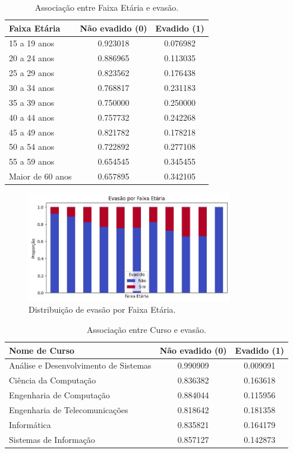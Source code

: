 \documentclass[english, spanish, brazilian]{RBIEarticle} %
\begin{document}
\begin{table}[H]
	\centering
	\caption{Associação entre Faixa Etária e evasão.}
	\label{tab:cat-faixa}
	\begin{tabular}{lcc}
		\toprule
		\textbf{Faixa Etária} & \textbf{Não evadido (0)} & \textbf{Evadido (1)} \\
		\midrule
		15 a 19 anos & 0.923018 & 0.076982 \\
		20 a 24 anos & 0.886965 & 0.113035 \\
		25 a 29 anos & 0.823562 & 0.176438 \\
		30 a 34 anos & 0.768817 & 0.231183 \\
		35 a 39 anos & 0.750000 & 0.250000 \\
		40 a 44 anos & 0.757732 & 0.242268 \\
		45 a 49 anos & 0.821782 & 0.178218 \\
		50 a 54 anos & 0.722892 & 0.277108 \\
		55 a 59 anos & 0.654545 & 0.345455 \\
		Maior de 60 anos & 0.657895 & 0.342105 \\
		\bottomrule
	\end{tabular}
\end{table}

\begin{figure}[H]\centering
	\includegraphics[width=0.8\textwidth]{images/evasao-faixa-etara.jpeg}
	\caption{Distribuição de evasão por Faixa Etária.}
	\label{fig:cat-faixa-hist}
\end{figure}

\begin{table}[H]
	\centering
	\caption{Associação entre Curso e evasão.}
	\label{tab:cat-curso}
	\begin{tabular}{lcc}
		\toprule
		\textbf{Nome de Curso} & \textbf{Não evadido (0)} & \textbf{Evadido (1)} \\
		\midrule
		Análise e Desenvolvimento de Sistemas & 0.990909 & 0.009091 \\
		Ciência da Computação & 0.836382 & 0.163618 \\
		Engenharia de Computação & 0.884044 & 0.115956 \\
		Engenharia de Telecomunicações & 0.818642 & 0.181358 \\
		Informática & 0.835821 & 0.164179 \\
		Sistemas de Informação & 0.857127 & 0.142873 \\
		\bottomrule
	\end{tabular}
\end{table}
\end{document}
